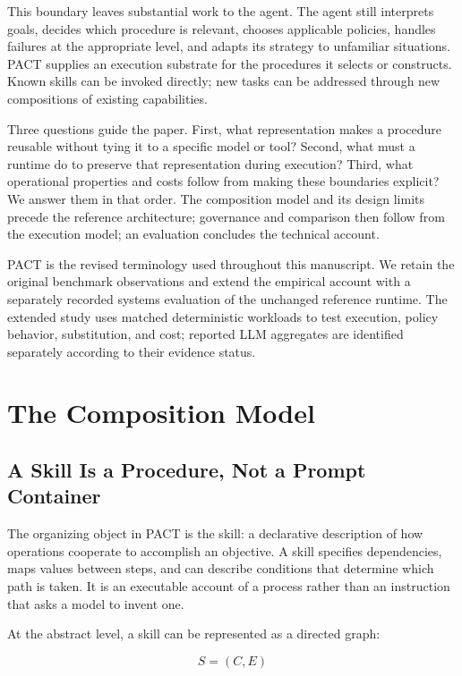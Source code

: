 \documentclass[10pt,twocolumn,a4paper]{article}
\begin{document}
This boundary leaves substantial work to the agent. The agent still interprets goals, decides which procedure is relevant, chooses applicable policies, handles failures at the appropriate level, and adapts its strategy to unfamiliar situations. PACT supplies an execution substrate for the procedures it selects or constructs. Known skills can be invoked directly; new tasks can be addressed through new compositions of existing capabilities.


Three questions guide the paper. First, what representation makes a procedure reusable without tying it to a specific model or tool? Second, what must a runtime do to preserve that representation during execution? Third, what operational properties and costs follow from making these boundaries explicit? We answer them in that order. The composition model and its design limits precede the reference architecture; governance and comparison then follow from the execution model; an evaluation concludes the technical account.


PACT is the revised terminology used throughout this manuscript. We retain the original benchmark observations and extend the empirical account with a separately recorded systems evaluation of the unchanged reference runtime. The extended study uses matched deterministic workloads to test execution, policy behavior, substitution, and cost; reported LLM aggregates are identified separately according to their evidence status.


\section{The Composition Model}

\subsection{A Skill Is a Procedure, Not a Prompt Container}

The organizing object in PACT is the skill: a declarative description of how operations cooperate to accomplish an objective. A skill specifies dependencies, maps values between steps, and can describe conditions that determine which path is taken. It is an executable account of a process rather than an instruction that asks a model to invent one.


At the abstract level, a skill can be represented as a directed graph:


\begin{equation}S = (C, E)\end{equation}
\end{document}
